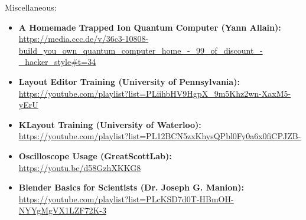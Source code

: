 \begin{flushleft}
\large Miscellaneous:
\end{flushleft}

\normalsize\begin{itemize}

  \item\textbf{A Homemade Trapped Ion Quantum Computer (Yann Allain):}\\
\url{https://media.ccc.de/v/36c3-10808-build_you_own_quantum_computer_home_-_99_of_discount_-_hacker_style#t=34}

  \item\textbf{Layout Editor Training (University of Pennsylvania):}\\
\url{https://youtube.com/playlist?list=PLiihbHV9HgpX_9m5Khz2wn-XaxM5-yErU}

  \item\textbf{KLayout Training (University of Waterloo):}\\
\url{https://youtube.com/playlist?list=PL12BCN5zxKhysQPbl0Fy0a6x0fiCPJZB-}

  \item\textbf{Oscilloscope Usage (GreatScottLab):}\\
\url{https://youtu.be/d58GzhXKKG8}

  \item\textbf{Blender Basics for Scientists (Dr. Joseph G. Manion):}\\
\url{https://youtube.com/playlist?list=PLcKSD7d0T-HBmOH-NYYgMgVX1LZF72K-3}\\

\end{itemize}
